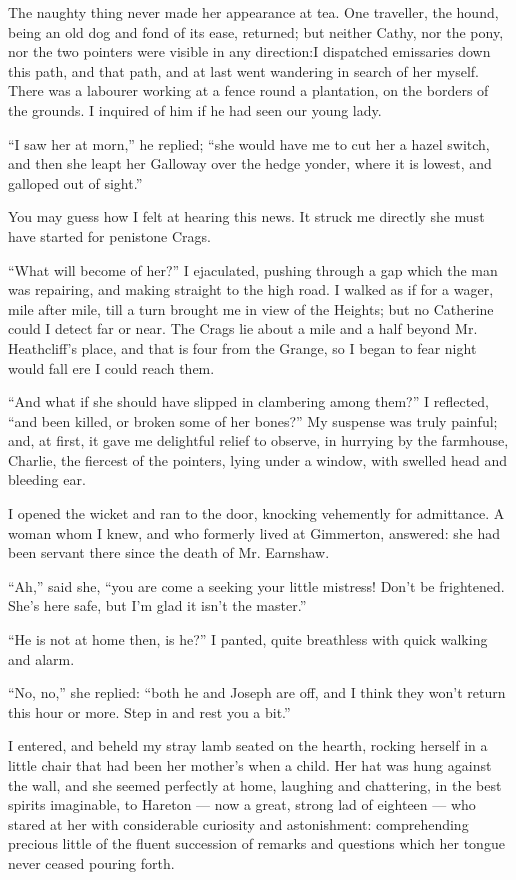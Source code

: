 \par The naughty thing never made her appearance at tea. One traveller, the hound, being an old dog and fond of its ease, returned; but neither Cathy, nor the pony, nor the two pointers were visible in any direction:I dispatched emissaries down this path, and that path, and at last went wandering in search of her myself. There was a labourer working at a fence round a plantation, on the borders of the grounds. I inquired of him if he had seen our young lady.
\par “I saw her at morn,” he replied; “she would have me to cut her a hazel switch, and then she leapt her Galloway over the hedge yonder, where it is lowest, and galloped out of sight.”
\par You may guess how I felt at hearing this news. It struck me directly she must have started for penistone Crags.
\par “What will become of her?” I ejaculated, pushing through a gap which the man was repairing, and making straight to the high road. I walked as if for a wager, mile after mile, till a turn brought me in view of the Heights; but no Catherine could I detect far or near. The Crags lie about a mile and a half beyond Mr. Heathcliff's place, and that is four from the Grange, so I began to fear night would fall ere I could reach them.
\par “And what if she should have slipped in clambering among them?” I reflected, “and been killed, or broken some of her bones?” My suspense was truly painful; and, at first, it gave me delightful relief to observe, in hurrying by the farmhouse, Charlie, the fiercest of the pointers, lying under a window, with swelled head and bleeding ear.
\par I opened the wicket and ran to the door, knocking vehemently for admittance. A woman whom I knew, and who formerly lived at Gimmerton, answered: she had been servant there since the death of Mr. Earnshaw.
\par “Ah,” said she, “you are come a seeking your little mistress! Don't be frightened. She's here safe, but I'm glad it isn't the master.”
\par “He is not at home then, is he?” I panted, quite breathless with quick walking and alarm.
\par “No, no,” she replied: “both he and Joseph are off, and I think they won't return this hour or more. Step in and rest you a bit.”
\par I entered, and beheld my stray lamb seated on the hearth, rocking herself in a little chair that had been her mother's when a child. Her hat was hung against the wall, and she seemed perfectly at home, laughing and chattering, in the best spirits imaginable, to Hareton — now a great, strong lad of eighteen — who stared at her with considerable curiosity and astonishment: comprehending precious little of the fluent succession of remarks and questions which her tongue never ceased pouring forth.
